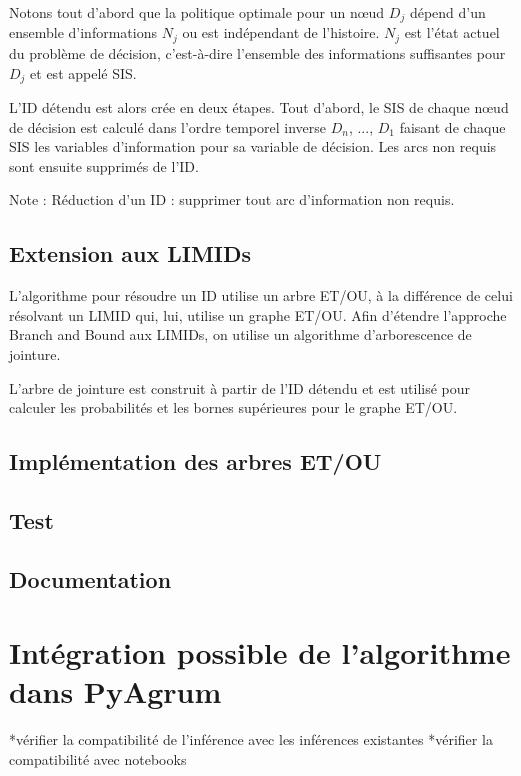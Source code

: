 \documentclass[12pt]{article}
\begin{document}
Notons tout d'abord que la politique optimale pour un nœud $D_j$ dépend d'un ensemble d'informations $N_j$ ou est indépendant de l'histoire. $N_j$ est l'état actuel du problème de décision, c'est-à-dire l'ensemble des informations suffisantes pour $D_j$ et est appelé SIS.

L'ID détendu est alors crée en deux étapes.
Tout d'abord, le SIS de chaque nœud de décision est calculé dans l'ordre temporel inverse $D_n$, ..., $D_1$ faisant de chaque SIS les variables d'information pour sa variable de décision.
Les arcs non requis sont ensuite supprimés de l'ID.

Note :
Réduction d'un ID : supprimer tout arc d'information non requis.

\subsection{Extension aux LIMIDs}
L'algorithme pour résoudre un ID utilise un arbre ET/OU, à la différence de celui résolvant un LIMID qui, lui, utilise un graphe ET/OU.
Afin d'étendre l'approche Branch and Bound aux LIMIDs, on utilise un algorithme d'arborescence de jointure.

L'arbre de jointure est construit à partir de l'ID détendu et est utilisé pour calculer les probabilités et les bornes supérieures pour le graphe ET/OU.

\subsection{Implémentation des arbres ET/OU}

\subsection{Test}

\subsection{Documentation}

\section{Intégration possible de l'algorithme dans PyAgrum}
*vérifier la compatibilité de l'inférence avec les inférences existantes
*vérifier la compatibilité avec notebooks
\end{document}

